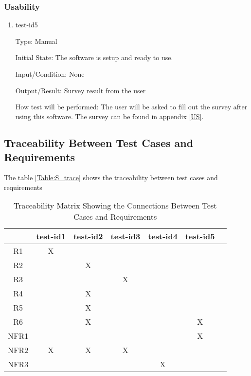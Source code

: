\documentclass[12pt, titlepage]{article}
\begin{document}
\subsubsection{Usability}
\begin{enumerate}

  \item{test-id5\\}
  
  Type: Manual
  
  Initial State: The software is setup and ready to use.
  
  Input/Condition: None
  
  Output/Result: Survey result from the user
  
  How test will be performed: The user will be asked to fill out the survey after using this software. The survey can be found in appendix \ref{US}.
  
  
  \end{enumerate}

\subsection{Traceability Between Test Cases and Requirements}

The table \ref{Table:S_trace}
 shows the traceability between test cases and requirements

\begin{table}[h!]\label{Table:S_trace}
  \centering
  \begin{tabular}{|c|c|c|c|c|c|c|}
  \hline
    & test-id1& test-id2& test-id3&test-id4&test-id5 \\
  \hline
  R1        & X&  & & &  \\ \hline
  R2        & & X& & &  \\ \hline
  R3        & & & X& & \\ \hline
  R4        & & X& & & \\ \hline
  R5        & &X & & & \\ \hline
  R6        & &X & & & X\\ \hline
  NFR1      & & & & &  X\\ \hline
  NFR2      &X & X& X& & \\ \hline
  NFR3      & & & &X & \\ \hline
  \end{tabular}
  \caption{Traceability Matrix Showing the Connections Between Test Cases and Requirements}
  \label{Table:A_trace}
  \end{table}
\end{document}
